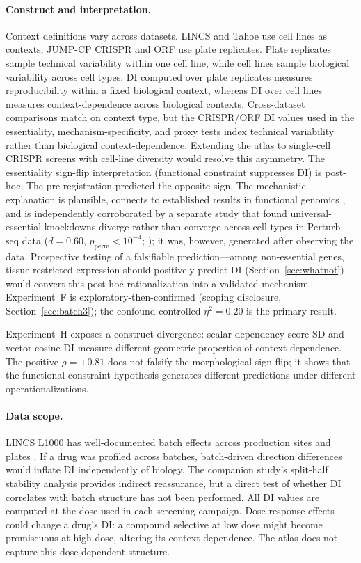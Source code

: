 \documentclass[11pt]{article}
\begin{document}
\paragraph{Construct and interpretation.}
Context definitions vary across datasets.  LINCS and Tahoe use cell
lines as contexts; JUMP-CP CRISPR and ORF use plate replicates.  Plate
replicates sample technical variability within one cell line, while cell
lines sample biological variability across cell types.  DI computed over
plate replicates measures reproducibility within a fixed biological
context, whereas DI over cell lines measures context-dependence across
biological contexts.  Cross-dataset comparisons match on context type,
but the CRISPR/ORF DI values used in the essentiality,
mechanism-specificity, and proxy tests index technical variability rather
than biological context-dependence.  Extending the atlas to single-cell
CRISPR screens with cell-line diversity \citep{tahoe2025} would resolve
this asymmetry.
The essentiality sign-flip interpretation (functional constraint
suppresses DI) is post-hoc.  The pre-registration predicted the
opposite sign.  The mechanistic explanation is plausible, connects to
established results in functional genomics
\citep{funk2022phenotypic, ramezani2025periscope}, and is independently
corroborated by a separate study that found universal-essential
knockdowns diverge rather than converge across cell types in Perturb-seq
data ($d = 0.60$, $p_{\mathrm{perm}} < 10^{-4}$;
\citealp{tower2026validity}); it was, however, generated after observing
the data.  Prospective testing of a
falsifiable prediction---among non-essential genes, tissue-restricted
expression should positively predict DI
(Section~\ref{sec:whatnot})---would convert this post-hoc
rationalization into a validated mechanism.
Experiment~F is exploratory-then-confirmed (scoping disclosure,
Section~\ref{sec:batch3}); the confound-controlled $\eta^2 = 0.20$ is
the primary result.

Experiment~H exposes a construct divergence: scalar dependency-score SD
and vector cosine DI measure different geometric properties of
context-dependence.  The positive $\rho = +0.81$ does not falsify the
morphological sign-flip; it shows that the functional-constraint
hypothesis generates different predictions under different operationalizations.

\paragraph{Data scope.}
LINCS L1000 has well-documented batch effects across production sites
and plates \citep{subramanian2017next}.  If a drug was profiled across
batches, batch-driven direction differences would inflate DI
independently of biology.  The companion study's split-half stability
analysis provides indirect reassurance, but a direct test of whether DI
correlates with batch structure has not been performed.
All DI values are computed at the dose used in each screening campaign.
Dose-response effects could change a drug's DI: a compound selective at
low dose might become promiscuous at high dose, altering its
context-dependence.  The atlas does not capture this dose-dependent
structure.
\end{document}
